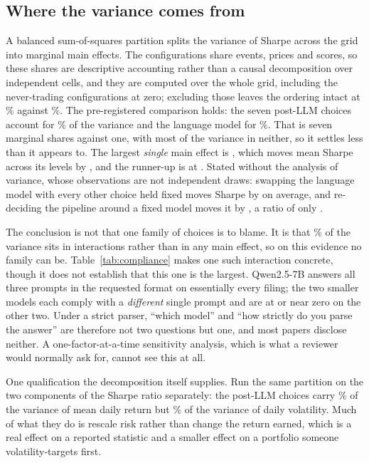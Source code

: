 \documentclass[sigconf]{acmart}
\begin{document}
\subsection{Where the variance comes from}
\label{sec:variance}

A balanced sum-of-squares partition splits the variance of Sharpe across the grid into marginal
main effects. The configurations share events, prices and scores, so these shares are descriptive
accounting rather than a causal decomposition over independent cells, and they are computed over
the whole grid, including the never-trading configurations at zero; excluding those leaves the
ordering intact at \VarSharePostLLMLive{}\% against \VarShareModelLive{}\%. The pre-registered comparison
holds: the seven post-LLM choices account for \VarSharePostLLM{}\% of the variance and the language
model for \VarShareModel{}\%. That is seven marginal shares against one, with most of the variance
in neither, so it settles less than it appears to. The largest \emph{single} main effect is
\TopFactorA{}, which moves
mean Sharpe across its levels by \TopFactorARange{}, and the runner-up is \TopFactorB{} at
\TopFactorBRange{}. Stated without the analysis of variance, whose observations are not independent
draws: swapping the language model with every other choice held fixed moves Sharpe by \ModelSD{} on
average, and re-deciding the pipeline around a fixed model moves it by \HarnessSD{}, a ratio of only
\SDRatio{}.

The conclusion is not that one family of choices is to blame. It is that \VarShareInteractions{}\%
of the variance sits in interactions rather than in any main effect, so on this evidence no family
can be. Table~\ref{tab:compliance} makes one such interaction concrete, though it does not establish
that this one is the largest. Qwen2.5-7B answers all three prompts in the requested format on
essentially every filing; the two smaller models each comply with a \emph{different} single prompt
and are at or near zero on the other two. Under a
strict parser, ``which model'' and ``how strictly do you parse the answer'' are therefore not two
questions but one, and most papers disclose neither. A one-factor-at-a-time
sensitivity analysis, which is what a reviewer would normally ask for, cannot see this at all.

One qualification the decomposition itself supplies. Run the same partition on the two components of
the Sharpe ratio separately: the post-LLM choices carry \VarShareMeanPostLLM{}\% of the variance of
mean daily return but \VarShareVolPostLLM{}\% of the variance of daily volatility. Much of what they
do is rescale risk rather than change the return earned, which is a real effect on a reported
statistic and a smaller effect on a portfolio someone volatility-targets first.
\end{document}
